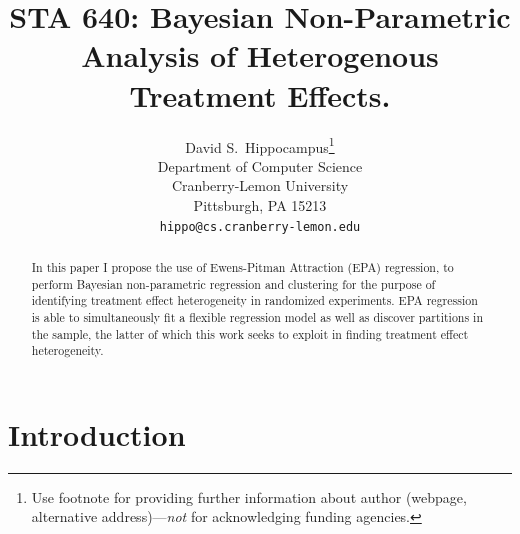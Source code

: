 \documentclass{article}
\title{STA 640: Bayesian Non-Parametric Analysis of Heterogenous Treatment Effects.}
\author{%
  David S.~Hippocampus\thanks{Use footnote for providing further information
    about author (webpage, alternative address)---\emph{not} for acknowledging
    funding agencies.} \\
  Department of Computer Science\\
  Cranberry-Lemon University\\
  Pittsburgh, PA 15213 \\
  \texttt{hippo@cs.cranberry-lemon.edu} \\
}
\begin{document}
\maketitle

\begin{abstract}
  In this paper I propose the use of Ewens-Pitman Attraction (EPA) regression, to perform Bayesian non-parametric regression and clustering for the purpose of identifying treatment effect heterogeneity in randomized experiments. EPA regression is able to simultaneously fit a flexible regression model as well as discover partitions in the sample, the latter of which this work seeks to exploit in finding treatment effect heterogeneity.  
\end{abstract}

\section{Introduction}
\end{document}
